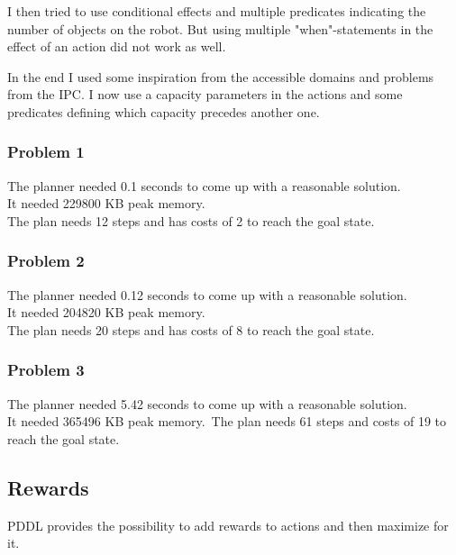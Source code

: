 \documentclass[paper=a4, fontsize=11pt]{scrartcl} %
\numberwithin{equation}{section} %
\numberwithin{figure}{section} %
\numberwithin{table}{section} %
\begin{document}
I then tried to use conditional effects and multiple predicates indicating the number of objects on the robot. 
But using multiple "when"-statements in the effect of an action did not work as well.\vspace{5mm}

In the end I used some inspiration from the accessible domains and problems from the IPC.
I now use a capacity parameters in the actions and some predicates defining which capacity precedes another one. 

\subsubsection{Problem 1}
The planner needed 0.1 seconds to come up with a reasonable solution. \\
It needed 229800 KB peak memory.\\
The plan needs 12 steps and has costs of 2 to reach the goal state.

\subsubsection{Problem 2}
The planner needed 0.12 seconds to come up with a reasonable solution. \\
It needed 204820 KB peak memory.\\
The plan needs 20 steps and has costs of 8 to reach the goal state.

\subsubsection{Problem 3}
The planner needed 5.42 seconds to come up with a reasonable solution. \\
It needed 365496 KB peak memory.\
The plan needs 61 steps and costs of 19 to reach the goal state. 


\subsection{Rewards}
PDDL provides the possibility to add rewards to actions and then maximize for it. 
\end{document}
